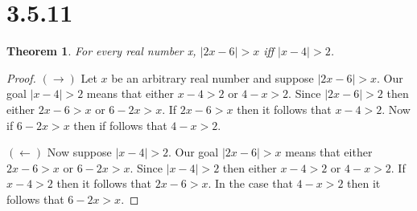 \documentclass{article}
\newtheorem*{theorem}{Theorem}  %
\begin{document}
\section*{3.5.11}
\begin{theorem} For every real number x, $|2x - 6| > x$ iff $|x - 4| > 2$.
\end{theorem}

\begin{proof}
$(\rightarrow)$ Let $x$ be an arbitrary real number and suppose $| 2x - 6 | > x $. Our goal $| x - 4 | > 2$ means that either $x - 4 > 2$ or $4 - x > 2$. Since $ | 2x - 6 | > 2 $ then either $2x - 6 > x$ or $6 - 2x > x$. If $2x - 6 > x$ then it follows that $x - 4 > 2$. Now if $6 - 2x > x$ then if follows that $4 - x >2$. 

$(\leftarrow)$ Now suppose $| x - 4 | > 2$. Our goal $| 2x - 6 | > x$ means that either $2x - 6 > x$ or $6 - 2x > x$. Since $| x - 4 | > 2$ then either $x - 4 > 2$ or $4 - x > 2$. If $x - 4 > 2$ then it follows that $2x - 6 > x$. In the case that $4 - x > 2$ then it follows that $6 - 2x > x$.

\end{proof}
\end{document}
